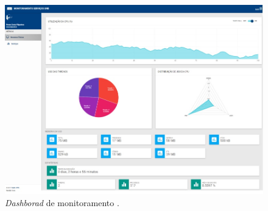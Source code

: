 \begin{figure}[h!]
	\begin{center}
	\includegraphics[scale = 0.70]{img/dashboard.jpg}
		\caption{\textit{Dashborad} de monitoramento \cite{filgueirasmonitoramento}.}
		\label{fun:fig:dashboardS}
	\end{center}
\end{figure}

